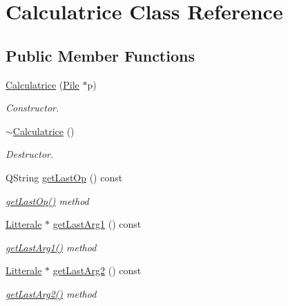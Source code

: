 \hypertarget{class_calculatrice}{}\section{Calculatrice Class Reference}
\label{class_calculatrice}
\subsection*{Public Member Functions}
\begin{DoxyCompactItemize}
\item 
\hyperlink{class_calculatrice_a2350ed13f91c824c7cd6c4a65ab42dde}{Calculatrice} (\hyperlink{class_pile}{Pile} $\ast$p)
\begin{DoxyCompactList}\small\item\em Constructor. \end{DoxyCompactList}\item 
\hyperlink{class_calculatrice_acb4b6278eb955ce932e16df29276be52}{$\sim$\+Calculatrice} ()
\begin{DoxyCompactList}\small\item\em Destructor. \end{DoxyCompactList}\item 
Q\+String \hyperlink{class_calculatrice_a05f1ea7ed7113ee8d4f92fd13d6e9591}{get\+Last\+Op} () const 
\begin{DoxyCompactList}\small\item\em \hyperlink{class_calculatrice_a05f1ea7ed7113ee8d4f92fd13d6e9591}{get\+Last\+Op()} method \end{DoxyCompactList}\item 
\hyperlink{class_litterale}{Litterale} $\ast$ \hyperlink{class_calculatrice_adb12970d2534774f003cc790b2a87f43}{get\+Last\+Arg1} () const 
\begin{DoxyCompactList}\small\item\em \hyperlink{class_calculatrice_adb12970d2534774f003cc790b2a87f43}{get\+Last\+Arg1()} method \end{DoxyCompactList}\item 
\hyperlink{class_litterale}{Litterale} $\ast$ \hyperlink{class_calculatrice_aeb2562cb73e9140652f3de990999e795}{get\+Last\+Arg2} () const 
\begin{DoxyCompactList}\small\item\em \hyperlink{class_calculatrice_aeb2562cb73e9140652f3de990999e795}{get\+Last\+Arg2()} method \end{DoxyCompactList}\item 

\end{DoxyCompactItemize}
